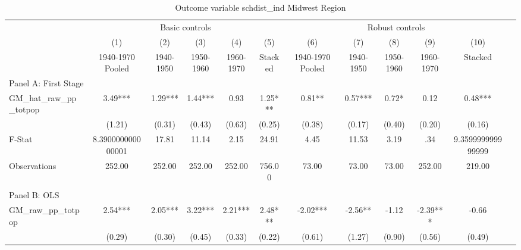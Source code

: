  \begin{table}[htbp]\centering {} \begin{threeparttable} \caption{Outcome variable schdist\_ind Midwest Region} \begin{tabular}{l*{11}{c}} \toprule
          &\multicolumn{5}{c}{Basic controls}                                   &\multicolumn{5}{c}{Robust controls}                                  \\\cmidrule(lr){2-6}\cmidrule(lr){7-11}
          &\multicolumn{1}{c}{(1)}&\multicolumn{1}{c}{(2)}&\multicolumn{1}{c}{(3)}&\multicolumn{1}{c}{(4)}&\multicolumn{1}{c}{(5)}&\multicolumn{1}{c}{(6)}&\multicolumn{1}{c}{(7)}&\multicolumn{1}{c}{(8)}&\multicolumn{1}{c}{(9)}&\multicolumn{1}{c}{(10)}\\
          &\multicolumn{1}{c}{1940-1970 Pooled}&\multicolumn{1}{c}{1940-1950}&\multicolumn{1}{c}{1950-1960}&\multicolumn{1}{c}{1960-1970}&\multicolumn{1}{c}{Stacked}&\multicolumn{1}{c}{1940-1970 Pooled}&\multicolumn{1}{c}{1940-1950}&\multicolumn{1}{c}{1950-1960}&\multicolumn{1}{c}{1960-1970}&\multicolumn{1}{c}{Stacked}\\
\cmidrule(lr){1-11}
\multicolumn{10}{l}{Panel A: First Stage}\\
\cmidrule(lr){1-11}
GM\_hat\_raw\_pp\_totpop&      3.49***&      1.29***&      1.44***&      0.93   &      1.25***&      0.81** &      0.57***&      0.72*  &      0.12   &      0.48***\\
          &    (1.21)   &    (0.31)   &    (0.43)   &    (0.63)   &    (0.25)   &    (0.38)   &    (0.17)   &    (0.40)   &    (0.20)   &    (0.16)   \\
\midrule
F-Stat    &8.390000000000001   &     17.81   &     11.14   &      2.15   &     24.91   &      4.45   &     11.53   &      3.19   &       .34   &9.359999999999999   \\
Observations&    252.00   &    252.00   &    252.00   &    252.00   &    756.00   &     73.00   &     73.00   &     73.00   &    252.00   &    219.00   \\
\cmidrule[\heavyrulewidth](lr){1-11} \\ \cmidrule[\heavyrulewidth](lr){1-11}
\multicolumn{10}{l}{Panel B: OLS}\\
\cmidrule(lr){1-11}
GM\_raw\_pp\_totpop&      2.54***&      2.05***&      3.22***&      2.21***&      2.48***&     -2.02***&     -2.56** &     -1.12   &     -2.39***&     -0.66   \\
          &    (0.29)   &    (0.30)   &    (0.45)   &    (0.33)   &    (0.22)   &    (0.61)   &    (1.27)   &    (0.90)   &    (0.56)   &    (0.49)   \\

\end{tabular}
\end{threeparttable}
\end{table}
